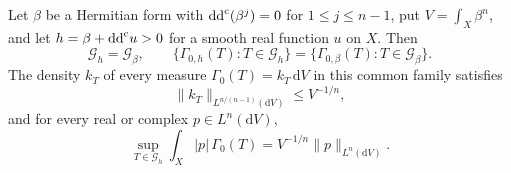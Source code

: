 \begin{theorem}\label{thm:constant-mass-entire-determinant-profile}
Let $\beta$ be a Hermitian form with
$\mathrm{dd}^{\mathrm{c}}(\beta^j)=0$ for $1\leq j\leq n-1$, put
$V=\int_X\beta^n$, and let $h=\beta+\mathrm{dd}^{\mathrm{c}} u>0$ for a smooth
real function $u$ on $X$. Then
\[
 \mathscr G_h=\mathscr G_\beta,\qquad
 \{\Gamma_{0,h}(T):T\in\mathscr G_h\}
 =\{\Gamma_{0,\beta}(T):T\in\mathscr G_\beta\}.
\]
The density $k_T$ of every measure $\Gamma_0(T)=k_T\,\mathrm dV$ in this common family satisfies
\[
 \|k_T\|_{L^{n/(n-1)}(\mathrm dV)}\leq V^{-1/n},
\]
and for every real or complex $p\in L^n(\mathrm dV)$,
\begin{equation}\label{eq:constant-mass-determinant-profile}
 \sup_{T\in\mathscr G_h}\int_X|p|\,\Gamma_0(T)
       =V^{-1/n}\|p\|_{L^n(\mathrm dV)}.
\end{equation}
\end{theorem}
